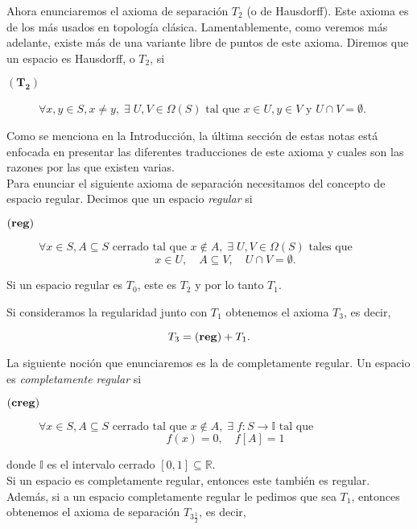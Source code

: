 \documentclass{comunicaciones}
\begin{document}
Ahora enunciaremos el axioma de separación $T_2$ (o de Hausdorff). Este axioma es de los más usados en topología clásica. Lamentablemente, como veremos más adelante, existe más de una variante libre de puntos de este axioma. Diremos que un espacio es Hausdorff, o $T_2$, si

\begin{description}
\item[$(\mathbf{T_2})$] $\forall x, y\in S, x\neq y,\; \exists\; U, V\in \Omega (S) \mbox{ tal que } x\in U, y\in V \mbox{ y } U\cap V=\emptyset$.
\end{description}
Como se menciona en la Introducción, la última sección de estas notas está enfocada en presentar las diferentes traducciones de este axioma y cuales son las razones por las que existen varias.\\


Para enunciar el siguiente axioma de separación necesitamos del concepto de espacio regular. Decimos que un espacio \emph{regular} si

\begin{description}
\item[$(\mbox{\textbf{reg}})$] $\forall x\in S, A\subseteq S \mbox{ cerrado tal que }x\notin A,\; \exists\; U, V\in \Omega (S) \mbox{ tales que }$
\[
x\in U,\quad A\subseteq V, \quad U\cap V=\emptyset.
\]
\end{description}

\begin{prop}
    Si un espacio regular es $T_0$, este es $T_2$ y por lo tanto $T_1$.
\end{prop}

Si consideramos la regularidad junto con $T_1$ obtenemos el axioma $T_3$, es decir, 

\[
T_3=(\mbox{\textbf{reg}}) + T_1.
\]

La siguiente noción que enunciaremos es la de completamente regular. Un espacio es \emph{completamente regular} si

\begin{description}
\item[$(\mbox{\textbf{creg}})$] $\forall x\in S, A\subseteq S \mbox{ cerrado tal que }x\notin A,\; \exists\; f\colon S\to \mathbb{I}  \mbox{ tal que }$
\[
f(x)=0,\quad f[A]=1
\]
\end{description}
donde $\mathbb{I}$ es el intervalo cerrado $[0,1]\subseteq \mathbb{R}$.\\

Si un espacio es completamente regular, entonces este también es regular. Además, si a un espacio completamente regular le pedimos que sea $T_1$, entonces obtenemos el axioma de separación $T_{3\frac{1}{2}}$, es decir,
\end{document}

